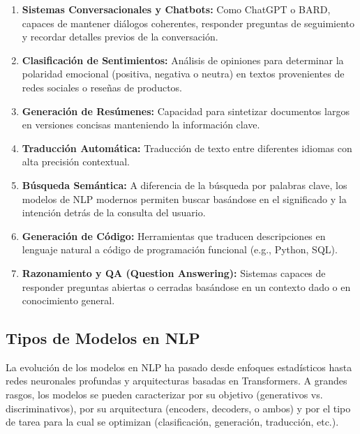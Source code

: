 \documentclass[11pt, a4paper]{article}
\begin{document}
\begin{enumerate}
    \item \textbf{Sistemas Conversacionales y Chatbots:} Como ChatGPT o BARD, capaces de mantener diálogos coherentes, responder preguntas de seguimiento y recordar detalles 
    previos de la conversación.
    \item \textbf{Clasificación de Sentimientos:} Análisis de opiniones para determinar la polaridad emocional (positiva, negativa o neutra) en textos provenientes de redes 
    sociales o reseñas de productos.
    \item \textbf{Generación de Resúmenes:} Capacidad para sintetizar documentos largos en versiones concisas manteniendo la información clave.
    \item \textbf{Traducción Automática:} Traducción de texto entre diferentes idiomas con alta precisión contextual.
    \item \textbf{Búsqueda Semántica:} A diferencia de la búsqueda por palabras clave, los modelos de NLP modernos permiten buscar basándose en el significado y la intención 
    detrás de la consulta del usuario.
    \item \textbf{Generación de Código:} Herramientas que traducen descripciones en lenguaje natural a código de programación funcional (e.g., Python, SQL).
    \item \textbf{Razonamiento y QA (Question Answering):} Sistemas capaces de responder preguntas abiertas o cerradas basándose en un contexto dado o en conocimiento general.
\end{enumerate}

\subsection{Tipos de Modelos en NLP}

La evolución de los modelos en NLP ha pasado desde enfoques estadísticos hasta redes neuronales profundas y arquitecturas basadas en Transformers. A grandes rasgos, los modelos
se pueden caracterizar por su objetivo (generativos vs. discriminativos), por su arquitectura (encoders, decoders, o ambos) y por el tipo de tarea para la cual se optimizan 
(clasificación, generación, traducción, etc.).
\end{document}
